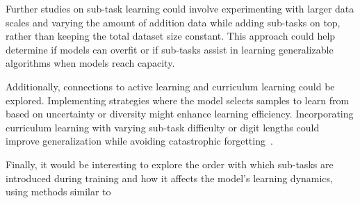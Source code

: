 Further studies on sub-task learning could involve experimenting with larger data scales and varying the amount of addition data while adding sub-tasks on top, rather than keeping the total dataset size constant. This approach could help determine if models can overfit or if sub-tasks assist in learning generalizable algorithms when models reach capacity.

Additionally, connections to active learning and curriculum learning could be explored. Implementing strategies where the model selects samples to learn from based on uncertainty or diversity might enhance learning efficiency. Incorporating curriculum learning with varying sub-task difficulty or digit lengths could improve generalization while avoiding catastrophic forgetting~\parencite{parisi_continual_2019}.

Finally, it would be interesting to explore the order with which sub-tasks are introduced during training and how it affects the model's learning dynamics, using methods similar to \cite{lee_what_2022}